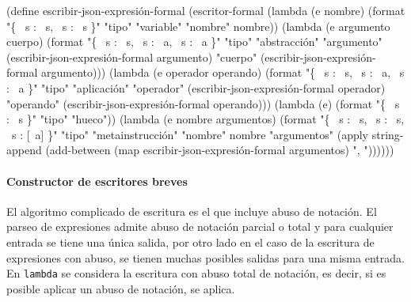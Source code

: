 \documentclass[10pt,oneside,openany,letterpaper]{book}
\begin{document}
\nwenddocs{}\plusendmoddef
(define escribir-json-expresión-formal
  (escritor-formal
   (lambda (e nombre)
     (format "\{ ~s : ~s, ~s : ~s \}"
             "tipo" "variable"
             "nombre" nombre))
   (lambda (e argumento cuerpo)
     (format "\{ ~s : ~s, ~s : ~a, ~s : ~a \}"
             "tipo" "abstracción"
             "argumento" (escribir-json-expresión-formal argumento)
             "cuerpo" (escribir-json-expresión-formal argumento)))
   (lambda (e operador operando)
     (format "\{ ~s : ~s, ~s : ~a, ~s : ~a \}"
             "tipo" "aplicación"
             "operador" (escribir-json-expresión-formal operador)
             "operando" (escribir-json-expresión-formal operando)))
   (lambda (e)
     (format "\{ ~s : ~s \}"
             "tipo" "hueco"))
   (lambda (e nombre argumentos)
     (format "\{ ~s : ~s, ~s : ~s, ~s : [~a] \}"
             "tipo" "metainstrucción"
             "nombre" nombre
             "argumentos"
             (apply string-append
                    (add-between (map escribir-json-expresión-formal
                                      argumentos)
                                 ", "))))))
\eatline
{}\nwendcode{}\nwdocspar
\paragraph{Constructor de escritores breves} El algoritmo complicado de escritura es el que incluye abuso de notación. El parseo de expresiones admite abuso de notación parcial o total y para cualquier entrada se tiene una única salida, por otro lado en el caso de la escritura de expresiones con abuso, se tienen muchas posibles salidas para una misma entrada. En {\tt{}lambda} se considera la escritura con abuso total de notación, es decir, si es posible aplicar un abuso de notación, se aplica.
\end{document}
